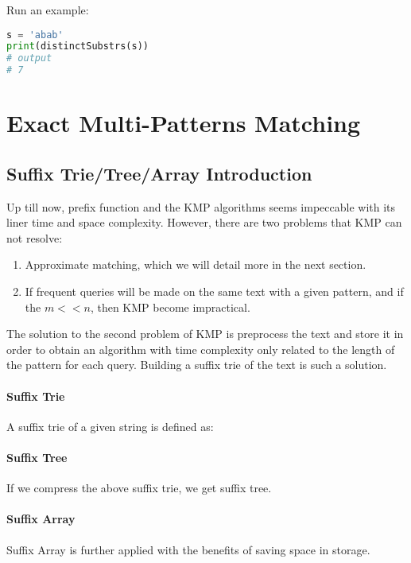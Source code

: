 \documentclass[../main.tex]{subfiles}
\begin{document}
Run an example:
\begin{lstlisting}[language=Python]
s = 'abab'
print(distinctSubstrs(s))
# output
# 7
\end{lstlisting}

\section{Exact Multi-Patterns Matching}

\subsection{Suffix Trie/Tree/Array Introduction}
\label{pattern_matching_subsec_suffix_trie}
Up till now, prefix function and the KMP algorithms seems impeccable with its liner time and space complexity. However, there are two problems that KMP can not resolve:
\begin{enumerate}
    \item Approximate matching, which we will detail more in the next section.
    \item If frequent queries will be made on the same text with a given pattern, and if the $m<<n$, then KMP become impractical.
\end{enumerate}

The solution to the second problem of KMP is preprocess the text and store it in order to obtain an algorithm with time complexity only related to the length of the pattern for each query. Building a suffix trie of the text is such a solution. 

\paragraph{Suffix Trie} A suffix trie of a given string is defined as: 

\paragraph{Suffix Tree} If we compress the above suffix trie, we get suffix tree. 

\paragraph{Suffix Array} Suffix Array is further applied with the benefits of saving space in storage. 
\end{document}
